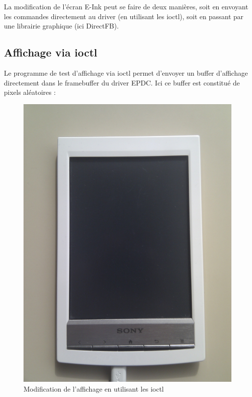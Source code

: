 La modification de l'écran E-Ink peut se faire de deux manières, soit en envoyant les commandes directement au driver (en utilisant les ioctl), soit en passant par une librairie graphique (ici DirectFB).


\subsection{Affichage via ioctl}

Le programme de test d'affichage via ioctl permet d'envoyer un buffer d'affichage directement dans le framebuffer du driver EPDC.
Ici ce buffer est constitué de pixels aléatoires : 
	
	\begin{figure}[h!]
		\begin{center}
			\includegraphics[scale=0.15]{screen_get_temp.jpg}
			 \caption{Modification de l'affichage en utilisant les ioctl}
		\end{center}
	\end{figure}

